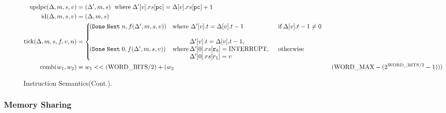 \documentclass[a4paper]{article}
\newcommand*{\PWBITS}{\text{WORD\_BITS}}
\newcommand*{\PWMAX}{\text{WORD\_MAX}}
\newcommand*{\INT}{\text{INTERRUPT}}
\newcommand*{\updpc}{\text{updpc}}
\begin{document}
\begin{figure}[!h]
  \begin{align*}
    \updpc(\Delta,m,s,v)&=(\Delta',m,s)\ \; \text{where}\; \Delta'[v].rs[\mathtt{pc}] = \Delta[v].rs[\mathtt{pc}]+1\\
    \text{id}(\Delta,m,s,v)& = (\Delta,m,s)\\
    \nextt(\Delta,m,s,f,v,n)&= \left\{\!\!\!\!\begin{array}{lll}
                                               \DNXT{n}{f(\Delta',m,s,v)} &\text{where } \Delta'[v].t = \Delta[v].t-1& \text{if}\: \Delta[v].t -1 \neq 0\\
                                               &\\
                                               \DNXT{0}{f(\Delta',m,s,v)} &\text{where } \!\!\!\! \begin{array}{l}
                                                                                      \Delta'[v].t = \Delta[v].t-1,\\
                                                                                      \Delta'[0].rs[\mathtt{r_{0}}]=\INT,\\
                                                                                      \Delta'[0].rs[r_{1}] = v
                                                                                      \end{array}& \text{otherwise}
                                              \end{array}  \right.\\
    \text{comb}(w_{1},w_{2})&=w_{1}<<(\PWBITS/2)+(w_{2}&(\PWMAX-(2^{\PWBITS/2}-1)))
  \end{align*}
  \caption{Instruction Semantics(Cont.).}
\end{figure}
\subsubsection{Memory Sharing}
\end{document}
